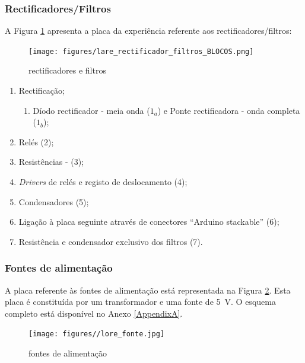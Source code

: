 \subsubsection{Rectificadores/Filtros}
A Figura \ref{fig:placarectificadores} apresenta a placa da experiência referente aos rectificadores/filtros:

\begin{figure}[hbtp]
	\centering
	\texttt{[image: figures/lare\_rectificador\_filtros\_BLOCOS.png]}
	\caption{ rectificadores e filtros}
	\label{fig:placarectificadores}
\end{figure}
 
\begin{enumerate}
	\item Rectificação;
		\begin{enumerate}
			\item \label{diodos}Díodo rectificador - meia onda ($1_{a}$) e Ponte rectificadora - onda completa ($1_{b}$);	
		\end{enumerate}
    \item Relés (2);
    \item Resistências - (3);
  	\item \textit{Drivers} de relés e registo de deslocamento (4);
	\item Condensadores (5);
	\item Ligação à placa seguinte através de conectores ``Arduino stackable'' (6);
	\item Resistência e condensador exclusivo dos filtros (7).
\end{enumerate}

\subsubsection{Fontes de alimentação}
A placa referente às fontes de alimentação está representada na Figura \ref{fig:placartransformador}. Esta placa é constituída por um transformador e uma fonte de \SI{5}{\volt}. O esquema completo está disponível no Anexo \ref{AppendixA}.

\begin{figure}[hbtp]
	\centering
	\texttt{[image: figures//lore\_fonte.jpg]}
	\caption{ fontes de alimentação}
	\label{fig:placartransformador}
\end{figure}

